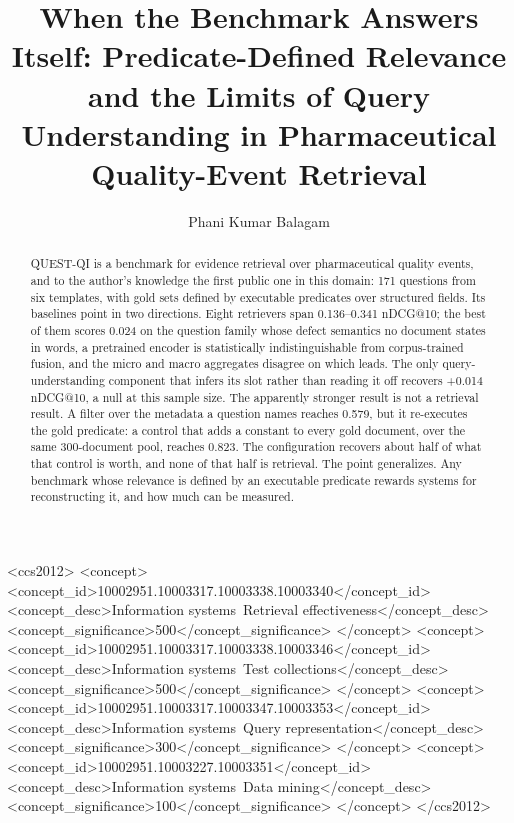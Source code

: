 \documentclass[acmsmall]{acmart}
\begin{document}
\title{When the Benchmark Answers Itself: Predicate-Defined Relevance and the Limits of Query Understanding in Pharmaceutical Quality-Event Retrieval}

\author{Phani Kumar Balagam}

\begin{abstract}
QUEST-QI is a benchmark for evidence retrieval over pharmaceutical quality events, and to the author's knowledge the first public one in this domain: 171 questions from six templates, with gold sets defined by executable predicates over structured fields. Its baselines point in two directions. Eight retrievers span 0.136--0.341 nDCG@10; the best of them scores 0.024 on the question family whose defect semantics no document states in words, a pretrained encoder is statistically indistinguishable from corpus-trained fusion, and the micro and macro aggregates disagree on which leads. The only query-understanding component that infers its slot rather than reading it off recovers +0.014 nDCG@10, a null at this sample size. The apparently stronger result is not a retrieval result. A filter over the metadata a question names reaches 0.579, but it re-executes the gold predicate: a control that adds a constant to every gold document, over the same 300-document pool, reaches 0.823. The configuration recovers about half of what that control is worth, and none of that half is retrieval. The point generalizes. Any benchmark whose relevance is defined by an executable predicate rewards systems for reconstructing it, and how much can be measured.
\end{abstract}

\begin{CCSXML}
<ccs2012>
   <concept>
       <concept_id>10002951.10003317.10003338.10003340</concept_id>
       <concept_desc>Information systems~Retrieval effectiveness</concept_desc>
       <concept_significance>500</concept_significance>
       </concept>
   <concept>
       <concept_id>10002951.10003317.10003338.10003346</concept_id>
       <concept_desc>Information systems~Test collections</concept_desc>
       <concept_significance>500</concept_significance>
       </concept>
   <concept>
       <concept_id>10002951.10003317.10003347.10003353</concept_id>
       <concept_desc>Information systems~Query representation</concept_desc>
       <concept_significance>300</concept_significance>
       </concept>
   <concept>
       <concept_id>10002951.10003227.10003351</concept_id>
       <concept_desc>Information systems~Data mining</concept_desc>
       <concept_significance>100</concept_significance>
       </concept>
</ccs2012>
\end{CCSXML}
\end{document}
